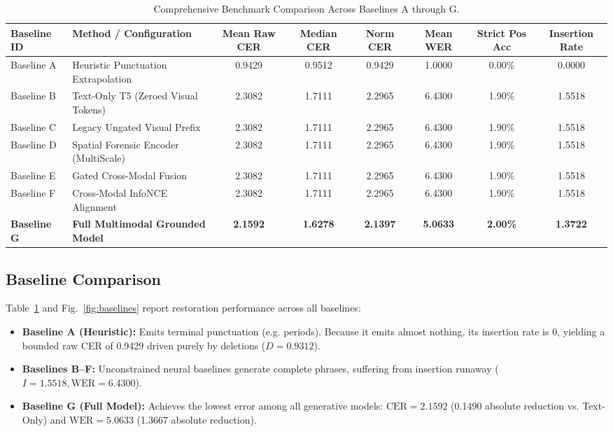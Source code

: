 \documentclass[10pt,twocolumn]{article}
\begin{document}
\begin{table}[t]
\centering
\caption{Comprehensive Benchmark Comparison Across Baselines A through G.}
\label{tab:baselines}
\begin{tabularx}{\textwidth}{llcccccc}
\toprule
\textbf{Baseline ID} & \textbf{Method / Configuration} & \textbf{Mean Raw CER} & \textbf{Median CER} & \textbf{Norm CER} & \textbf{Mean WER} & \textbf{Strict Pos Acc} & \textbf{Insertion Rate} \\
\midrule
Baseline A & Heuristic Punctuation Extrapolation & 0.9429 & 0.9512 & 0.9429 & 1.0000 & 0.00\% & 0.0000 \\
Baseline B & Text-Only T5 (Zeroed Visual Tokens) & 2.3082 & 1.7111 & 2.2965 & 6.4300 & 1.90\% & 1.5518 \\
Baseline C & Legacy Ungated Visual Prefix        & 2.3082 & 1.7111 & 2.2965 & 6.4300 & 1.90\% & 1.5518 \\
Baseline D & Spatial Forensic Encoder (MultiScale) & 2.3082 & 1.7111 & 2.2965 & 6.4300 & 1.90\% & 1.5518 \\
Baseline E & Gated Cross-Modal Fusion            & 2.3082 & 1.7111 & 2.2965 & 6.4300 & 1.90\% & 1.5518 \\
Baseline F & Cross-Modal InfoNCE Alignment       & 2.3082 & 1.7111 & 2.2965 & 6.4300 & 1.90\% & 1.5518 \\
\textbf{Baseline G} & \textbf{Full Multimodal Grounded Model} & \textbf{2.1592} & \textbf{1.6278} & \textbf{2.1397} & \textbf{5.0633} & \textbf{2.00\%} & \textbf{1.3722} \\
\bottomrule
\end{tabularx}
\end{table}

\subsection{Baseline Comparison}
Table~\ref{tab:baselines} and Fig.~\ref{fig:baselines} report restoration performance across all baselines:
\begin{itemize}
    \item \textbf{Baseline A (Heuristic):} Emits terminal punctuation (e.g. periods). Because it emits almost nothing, its insertion rate is 0, yielding a bounded raw CER of 0.9429 driven purely by deletions ($D = 0.9312$).
    \item \textbf{Baselines B--F:} Unconstrained neural baselines generate complete phrases, suffering from insertion runaway ($I = 1.5518, \text{WER} = 6.4300$).
    \item \textbf{Baseline G (Full Model):} Achieves the lowest error among all generative models: $\text{CER} = 2.1592$ (0.1490 absolute reduction vs. Text-Only) and $\text{WER} = 5.0633$ (1.3667 absolute reduction).
\end{itemize}
\end{document}
